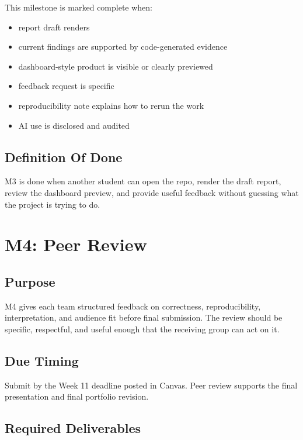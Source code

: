 \documentclass[
  letterpaper,
  DIV=11,
  numbers=noendperiod,
  oneside]{scrreprt}
\providecommand{\tightlist}{%
  \setlength{\itemsep}{0pt}\setlength{\parskip}{0pt}}
\begin{document}
This milestone is marked complete when:

\begin{itemize}
\tightlist
\item
  report draft renders
\item
  current findings are supported by code-generated evidence
\item
  dashboard-style product is visible or clearly previewed
\item
  feedback request is specific
\item
  reproducibility note explains how to rerun the work
\item
  AI use is disclosed and audited
\end{itemize}

\section{Definition Of Done}\label{definition-of-done-24}

M3 is done when another student can open the repo, render the draft
report, review the dashboard preview, and provide useful feedback
without guessing what the project is trying to do.

\chapter{M4: Peer Review}\label{m4-peer-review}

\section{Purpose}\label{purpose-17}

M4 gives each team structured feedback on correctness, reproducibility,
interpretation, and audience fit before final submission. The review
should be specific, respectful, and useful enough that the receiving
group can act on it.

\section{Due Timing}\label{due-timing-4}

Submit by the Week 11 deadline posted in Canvas. Peer review supports
the final presentation and final portfolio revision.

\section{Required Deliverables}\label{required-deliverables-4}
\end{document}
